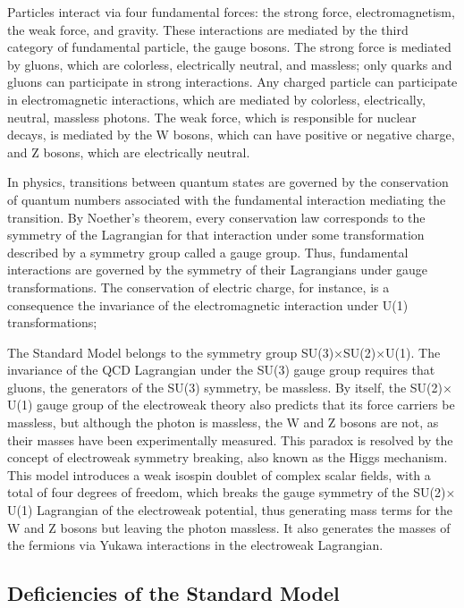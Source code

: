 Particles interact via four fundamental forces: the strong force, electromagnetism, the weak force, and gravity. These interactions are mediated by the third category of fundamental particle, the gauge bosons. The strong force is mediated by gluons, which are colorless, electrically neutral, and massless; only quarks and gluons can participate in strong interactions. Any charged particle can participate in electromagnetic interactions, which are mediated by colorless, electrically, neutral, massless photons. The weak force, which is responsible for nuclear decays, is mediated by the W bosons, which can have positive or negative charge, and Z bosons, which are electrically neutral.

In physics, transitions between quantum states are governed by the conservation of quantum numbers associated with the fundamental interaction mediating the transition. By Noether's theorem, every conservation law corresponds to the symmetry of the Lagrangian for that interaction under some transformation described by a symmetry group called a gauge group. Thus, fundamental interactions are governed by the symmetry of their Lagrangians under gauge transformations. The conservation of electric charge, for instance, is a consequence the invariance of the electromagnetic interaction under U(1) transformations; 

The Standard Model belongs to the symmetry group SU(3)$\times$SU(2)$\times$U(1). The invariance of the QCD Lagrangian under the SU(3) gauge group requires that gluons, the generators of the SU(3) symmetry, be massless. By itself, the SU(2)$\times$U(1) gauge group of the electroweak theory also predicts that its force carriers be massless, but although the photon is massless, the W and Z bosons are not, as their masses have been experimentally measured. This paradox is resolved by the concept of electroweak symmetry breaking, also known as the Higgs mechanism. This model introduces a weak isospin doublet of complex scalar fields, with a total of four degrees of freedom, which breaks the gauge symmetry of the SU(2)$\times$U(1) Lagrangian of the electroweak potential, thus generating mass terms for the W and Z bosons but leaving the photon massless. It also generates the masses of the fermions via Yukawa interactions in the electroweak Lagrangian.

\subsection{Deficiencies of the Standard Model\label{sec:SMdeficiencies}}

